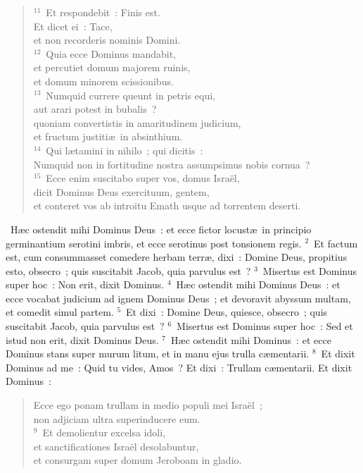 \begin{flushleft}
\begin{verse}
${}^{11}$~Et respondebit~: Finis est.\\ Et dicet ei~: Tace,\\ et non recorderis nominis Domini.\\
${}^{12}$~Quia ecce Dominus mandabit,\\ et percutiet domum majorem ruinis,\\ et domum minorem scissionibus.\\
${}^{13}$~Numquid currere queunt in petris equi,\\ aut arari potest in bubalis~?\\ quoniam convertistis in amaritudinem judicium,\\ et fructum justiti\ae\ in absinthium.\\
${}^{14}$~Qui l\ae tamini in nihilo~; qui dicitis~:\\ Numquid non in fortitudine nostra assumpsimus nobis cornua~?\\
${}^{15}$~Ecce enim suscitabo super vos, domus Isra\"el,\\ dicit Dominus Deus exercituum, gentem,\\ et conteret vos ab introitu Emath usque ad torrentem deserti.\end{verse}\end{flushleft}


~\lettrine[lines=10,image=true,loversize=0.05,lraise=-0.03]{H}{}\ae c ostendit mihi Dominus Deus~: et ecce fictor locust\ae\ in principio germinantium serotini imbris, et ecce serotinus post tonsionem regis.
${}^{2}$~Et factum est, cum consummasset comedere herbam terr\ae , dixi~: Domine Deus, propitius esto, obsecro~; quis suscitabit Jacob, quia parvulus est~?
${}^{3}$~Misertus est Dominus super hoc~: Non erit, dixit Dominus.
${}^{4}$~H\ae c ostendit mihi Dominus Deus~: et ecce vocabat judicium ad ignem Dominus Deus~; et devoravit abyssum multam, et comedit simul partem.
${}^{5}$~Et dixi~: Domine Deus, quiesce, obsecro~; quis suscitabit Jacob, quia parvulus est~?
${}^{6}$~Misertus est Dominus super hoc~: Sed et istud non erit, dixit Dominus Deus.
${}^{7}$~H\ae c ostendit mihi Dominus~: et ecce Dominus stans super murum litum, et in manu ejus trulla c\ae mentarii.
${}^{8}$~Et dixit Dominus ad me~: Quid tu vides, Amos~? Et dixi~: Trullam c\ae mentarii. Et dixit Dominus~: \begin{flushleft}\begin{verse}Ecce ego ponam trullam in medio populi mei Isra\"el~;\\ non adjiciam ultra superinducere eum.\\
${}^{9}$~Et demolientur excelsa idoli,\\ et sanctificationes Isra\"el desolabuntur,\\ et consurgam super domum Jeroboam in gladio.\end{verse}\end{flushleft}


